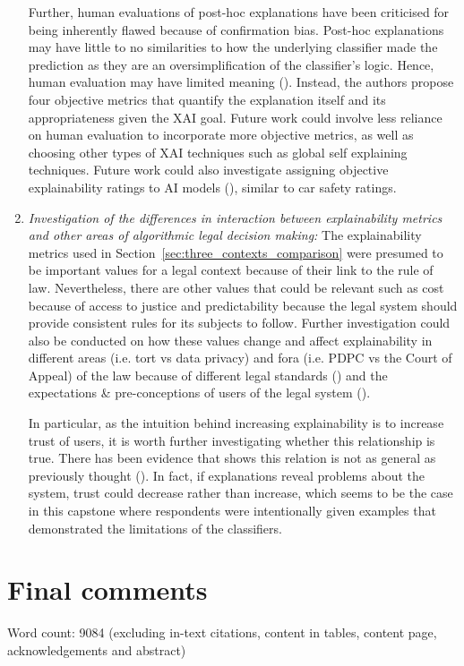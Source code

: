 \begin{enumerate}
    Further, human evaluations of post-hoc explanations have been criticised for being inherently flawed because of confirmation bias. Post-hoc explanations may have little to no similarities to how the underlying classifier made the prediction as they are an oversimplification of the classifier's logic. Hence, human evaluation may have limited meaning (\cite{rosenfeld2021}). Instead, the authors propose four objective metrics that quantify the explanation itself and its appropriateness given the XAI goal. Future work could involve less reliance on human evaluation to incorporate more objective metrics, as well as choosing other types of XAI techniques such as global self explaining techniques. Future work could also investigate assigning objective explainability ratings to AI models (\cite{waltl2018}), similar to car safety ratings.

    \item \textit{Investigation of the differences in interaction between explainability metrics and other areas of algorithmic legal decision making:} The explainability metrics used in Section~\ref{sec:three_contexts_comparison} were presumed to be important values for a legal context because of their link to the rule of law. Nevertheless, there are other values that could be relevant such as cost because of access to justice and predictability because the legal system should provide consistent rules for its subjects to follow. Further investigation could also be conducted on how these values change and affect explainability in different areas (i.e. tort vs data privacy) and fora (i.e. PDPC vs the Court of Appeal) of the law because of different legal standards (\cite{hacker2022varieties}) and the expectations \& pre-conceptions of users of the legal system (\cite{yalcin2022perceptions}).
    
    In particular, as the intuition behind increasing explainability is to increase trust of users, it is worth further investigating whether this relationship is true. There has been evidence that shows this relation is not as general as previously thought (\cite{kastner2021}). In fact, if explanations reveal problems about the system, trust could decrease rather than increase, which seems to be the case in this capstone where respondents were intentionally given examples that demonstrated the limitations of the classifiers.
\end{enumerate}

\section{Final comments}


Word count: 9084 (excluding in-text citations, content in tables, content page, acknowledgements and abstract)